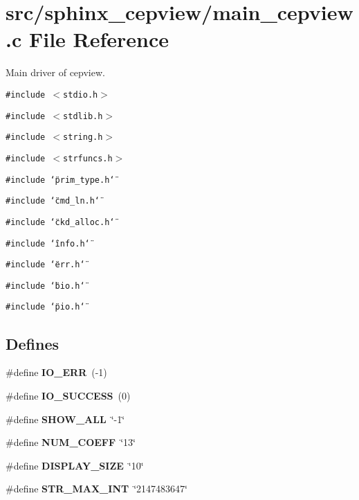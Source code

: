 \section{src/sphinx\_\-cepview/main\_\-cepview.c File Reference}
\label{main__cepview_8c}
Main driver of cepview.  


{\tt \#include $<$stdio.h$>$}\par
{\tt \#include $<$stdlib.h$>$}\par
{\tt \#include $<$string.h$>$}\par
{\tt \#include $<$strfuncs.h$>$}\par
{\tt \#include \char`\"{}prim\_\-type.h\char`\"{}}\par
{\tt \#include \char`\"{}cmd\_\-ln.h\char`\"{}}\par
{\tt \#include \char`\"{}ckd\_\-alloc.h\char`\"{}}\par
{\tt \#include \char`\"{}info.h\char`\"{}}\par
{\tt \#include \char`\"{}err.h\char`\"{}}\par
{\tt \#include \char`\"{}bio.h\char`\"{}}\par
{\tt \#include \char`\"{}pio.h\char`\"{}}\par
\subsection*{Defines}
\begin{CompactItemize}
\item 
\#define \textbf{IO\_\-ERR}~(-1)\label{main__cepview_8c_2f594e19531c324dd254ba0cc712044d}

\item 
\#define \textbf{IO\_\-SUCCESS}~(0)\label{main__cepview_8c_dad481c8f8fcb43725ccb11be5c690f4}

\item 
\#define \textbf{SHOW\_\-ALL}~\char`\"{}-1\char`\"{}\label{main__cepview_8c_addcd19f0e123722b857ec68d1d3e156}

\item 
\#define \textbf{NUM\_\-COEFF}~\char`\"{}13\char`\"{}\label{main__cepview_8c_56e7544225bcd9da32fa61cde6e6f523}

\item 
\#define \textbf{DISPLAY\_\-SIZE}~\char`\"{}10\char`\"{}\label{main__cepview_8c_035c0b93babde37c8919064af8b67928}

\item 
\#define \textbf{STR\_\-MAX\_\-INT}~\char`\"{}2147483647\char`\"{}\label{main__cepview_8c_01f1f09f8562ef6971aa38c4f8f32954}

\end{CompactItemize}
